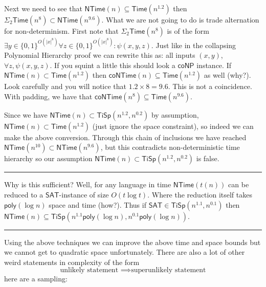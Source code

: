 \documentclass[twoside]{article}
\newenvironment{proof}{{\bf Proof:}}{\hfill\rule{2mm}{2mm}}
\def\coNP{\mathsf{coNP}}
\def\Time{\mathsf{Time}}
\def\SAT{\mathsf{SAT}}
\def\NTime{\mathsf{NTime}}
\def\TiSp{\mathsf{TiSp}}
\def\poly{\mathsf{poly}}
\begin{document}
\begin{proof}
\begin{proof}
Next we need to see that $\NTime (n) \subseteq \Time (n^{1.2})$ then $\Sigma_2 \Time (n^8) \subset \NTime (n^{9.6})$. What we are not going to do is trade alternation for non-determinism. First note that $\Sigma_2 \Time (n^8)$ is of the form $\exists y \in \{0,1\}^{O(|x|^8)}\forall z \in \{0,1\}^{O(|x|^8)}: \psi (x,y,z)$. Just like in the collapsing Polynomial Hierarchy proof we can rewrite this as: all inputs $(x,y)$, $\forall z, \psi (x,y,z)$. If you squint a little this should look a $\coNP$ instance. If $\NTime (n) \subset \Time (n^{1.2})$ then $\mathsf{coNTime} (n) \subseteq \Time (n^{1.2})$ as well (why?). Look carefully and you will notice that $1.2 \times 8 = 9.6$. This is not a coincidence. With padding, we have that $\mathsf{coNTime} (n^8) \subseteq \Time (n^{9.6})$.  

Since we have $\NTime (n) \subset \TiSp (n^{1.2}, n^{0.2})$ by assumption, $\NTime (n) \subset \Time (n^{1.2})$ (just ignore the space constraint), so indeed we can make the above conversion. Through this chain of inclusions we have reached $\NTime (n^{10}) \subset \NTime (n^{9.6})$, but this contradicts non-deterministic time hierarchy so our assumption $\NTime (n) \subset \TiSp (n^{1.2}, n^{0.2})$ is false.   
\end{proof}

Why is this sufficient? Well, for any language in time $\NTime (t(n))$ can be reduced to a $\SAT$-instance of size $O(t \log t)$. Where the reduction itself takes $\poly (\log n)$ space and time (how?). Thus if $\SAT \in \TiSp(n^{1.1}, n^{0.1})$ then $\NTime (n) \subseteq \TiSp (n^{1.1}\poly (\log n), n^{0.1} \poly (\log n))$.
\end{proof}

Using the above techniques we can improve the above time and space bounds but we cannot get to quadratic space unfortunately. There are also a lot of other weird statements in complexity of the form 
\[\mbox{unlikely statement } \implies \mbox{superunlikely statement}\]
here are a sampling: 
\end{document}
